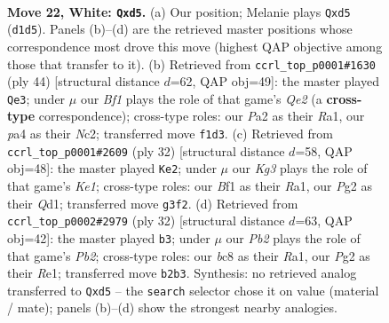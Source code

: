 \documentclass[11pt]{article}
\begin{document}
\clearpage

\begin{figure}[p]\centering
\begin{subfigure}{0.46\textwidth}\centering
\resizebox{\linewidth}{!}{%
\newchessgame
\chessboard[
  setfen={1nb1qrk1/1r3ppp/8/2ppPp2/p4P2/6K1/PPP3PP/R2Q1BNR w - - 0 22},
  showmover=false,
  pgfstyle=straightmove, color=movearrow, markmove={d1-d5}
]}
\caption{}
\end{subfigure}\hfill
\begin{subfigure}{0.46\textwidth}\centering
\resizebox{\linewidth}{!}{%
\newchessgame
\chessboard[
  setfen={r2r2k1/1bqn1ppp/pp1pp3/8/P1P1P2P/1P4P1/2NRQPB1/R5K1 w - - 2 23},
  showmover=false,
  pgfstyle=straightmove, color=movearrow, markmove={e2-e3}
]}
\caption{}
\end{subfigure}
\\[4pt]
\begin{subfigure}{0.46\textwidth}\centering
\resizebox{\linewidth}{!}{%
\newchessgame
\chessboard[
  setfen={r2r2k1/pp1q1ppp/5b2/4p3/8/3PBPPP/PP3P2/R2QK2R w KQ - 3 17},
  showmover=false,
  pgfstyle=straightmove, color=movearrow, markmove={e1-e2}
]}
\caption{}
\end{subfigure}\hfill
\begin{subfigure}{0.46\textwidth}\centering
\resizebox{\linewidth}{!}{%
\newchessgame
\chessboard[
  setfen={1r3rk1/p1pb2qp/2pp1p2/6p1/4P3/6B1/PPP2PPP/R2QR1K1 w - - 0 17},
  showmover=false,
  pgfstyle=straightmove, color=movearrow, markmove={b2-b3}
]}
\caption{}
\end{subfigure}
\caption{\textbf{Move 22, White: \texttt{Qxd5}.} (a) Our position; Melanie plays \texttt{Qxd5} (\texttt{d1d5}). Panels (b)--(d) are the retrieved master positions whose correspondence most drove this move (highest QAP objective among those that transfer to it). (b) Retrieved from \texttt{ccrl\_top\_p0001\#1630} (ply 44) [structural distance $d$=62, QAP obj=49]: the master played \texttt{Qe3}; under $\mu$ our \emph{Bf1} plays the role of that game's \emph{Qe2} (a \textbf{cross-type} correspondence); cross-type roles: our \emph{P}a2 as their \emph{R}a1, our \emph{p}a4 as their \emph{N}c2; transferred move \texttt{f1d3}. (c) Retrieved from \texttt{ccrl\_top\_p0001\#2609} (ply 32) [structural distance $d$=58, QAP obj=48]: the master played \texttt{Ke2}; under $\mu$ our \emph{Kg3} plays the role of that game's \emph{Ke1}; cross-type roles: our \emph{B}f1 as their \emph{R}a1, our \emph{P}g2 as their \emph{Q}d1; transferred move \texttt{g3f2}. (d) Retrieved from \texttt{ccrl\_top\_p0002\#2979} (ply 32) [structural distance $d$=63, QAP obj=42]: the master played \texttt{b3}; under $\mu$ our \emph{Pb2} plays the role of that game's \emph{Pb2}; cross-type roles: our \emph{b}c8 as their \emph{R}a1, our \emph{P}g2 as their \emph{R}e1; transferred move \texttt{b2b3}. Synthesis: no retrieved analog transferred to \texttt{Qxd5} -- the \texttt{search} selector chose it on value (material / mate); panels (b)--(d) show the strongest nearby analogies.}
\label{fig:thought-m42}
\end{figure}
\end{document}
